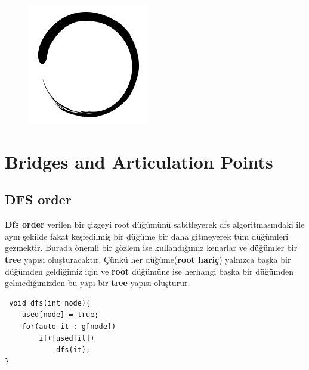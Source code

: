 \documentclass[12pt]{article}
\title{\vspace{-2em}\mytitle\vspace{-0.3em}}
\author{
	\textbf{Editor}\\
	Ekrem BAL  \\ \ \\ 
	\textbf{Reviewers} \\ 
	Bahadır ALTUN \\
	Yasin KAYA \\
	Burak BUĞRUL \\
}
\date{}
\begin{document}
	
	\begin{figure}
		\centering
		\includegraphics[width=\linewidth/4]{inzva-logo.png}
		\label{fig:inzva}
	\end{figure}
	\maketitle
	
	\cleardoublepage
	\tableofcontents
	\cleardoublepage
	
	 
    \section{Bridges and Articulation Points}
    \subsection{DFS order}
    \textbf{Dfs order} verilen bir çizgeyi root düğümünü sabitleyerek dfs algoritmasındaki ile aynı şekilde fakat keşfedilmiş bir düğüme bir daha gitmeyerek tüm düğümleri gezmektir. Burada önemli bir gözlem ise kullandığımız kenarlar ve düğümler bir \textbf{tree} yapısı oluşturacaktır. Çünkü her düğüme(\textbf{root hariç}) yalnızca başka bir düğümden geldiğimiz için ve \textbf{root} düğümüne ise herhangi başka bir düğümden gelmediğimizden bu yapı bir \textbf{tree} yapısı oluşturur.
   \begin{verbatim}
 void dfs(int node){
	used[node] = true;
	for(auto it : g[node])
		if(!used[it])
			dfs(it);
}
   \end{verbatim}
    
\end{document}
